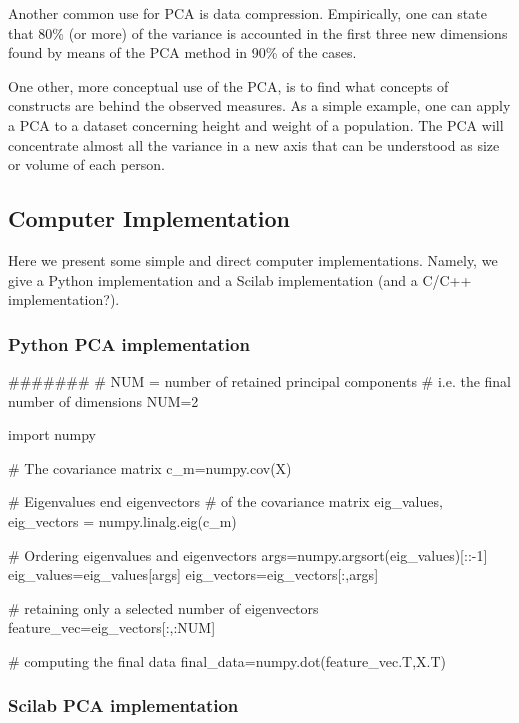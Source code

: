 \documentclass[12pt]{article}
\begin{document}
Another common use for PCA is data compression. Empirically, one can state that
80\% (or more) of the variance is accounted in the first three new dimensions
found by means of the PCA method in 90\% of the cases.

One other, more conceptual use of the PCA, is to find what concepts of constructs
are behind the observed measures. As a simple example, one can apply a PCA to a
dataset concerning height and weight of a population. The PCA will concentrate almost
all the variance in a new axis that can be understood as size or volume of
each person.

\subsection{Computer Implementation}
Here we present some simple and direct computer implementations. Namely, we give a Python
implementation and a Scilab implementation (and a C/C++ implementation?).

\subsubsection{Python PCA implementation}

\begin{code}
#######
# NUM = number of retained principal components
# i.e. the final number of dimensions
NUM=2

import numpy

# The covariance matrix
c_m=numpy.cov(X)

# Eigenvalues end eigenvectors
# of the covariance matrix
eig_values, eig_vectors = numpy.linalg.eig(c_m)

# Ordering eigenvalues and eigenvectors
args=numpy.argsort(eig_values)[::-1]
eig_values=eig_values[args]
eig_vectors=eig_vectors[:,args]

# retaining only a selected number of eigenvectors
feature_vec=eig_vectors[:,:NUM]

# computing the final data
final_data=numpy.dot(feature_vec.T,X.T)
\end{code}

\subsubsection{Scilab PCA implementation}
\end{document}
